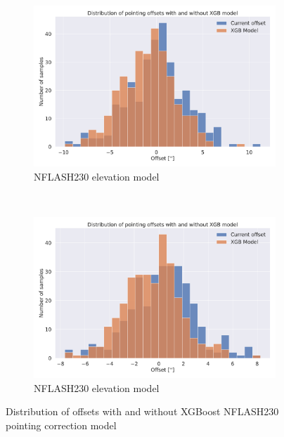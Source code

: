 \begin{figure}[H]
    \centering
    \begin{subfigure}[t]{\textwidth}
        \centering
        \includegraphics[width=\textwidth]{Results/hist_XGB_ds2_tp5_k30_uncorr_az_test.pdf}
        \caption{NFLASH230 elevation model}
        \label{subfig:hist_lastfold_nflash230_az}
    \end{subfigure}
    \\
    \begin{subfigure}[t]{\textwidth}
       \centering
       \includegraphics[width=\textwidth]{Results/hist_XGB_ds2_tp5_k40_uncorr_el_test.pdf}
       \caption{NFLASH230 elevation model}
       \label{subfig:hist_lastfold_nflash230_el}
    \end{subfigure}
    \caption{Distribution of offsets with and without XGBoost NFLASH230 pointing correction model}
    \label{fig:histogram_selected_result_xgb}
\end{figure}


